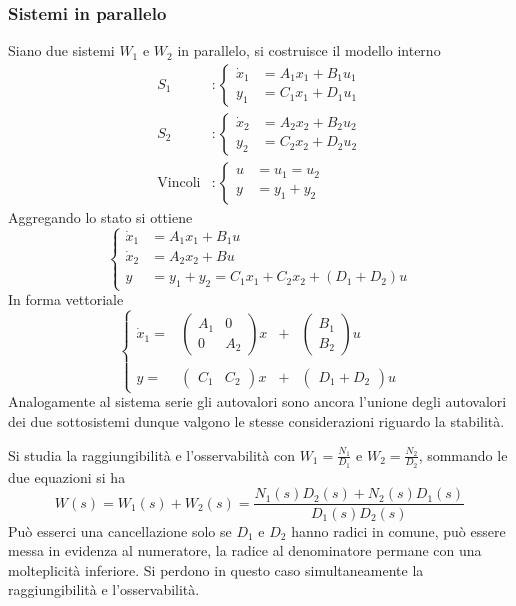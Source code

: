 \subsubsection{Sistemi in parallelo}
Siano due sistemi $W_1$ e $W_2$ in parallelo, si costruisce il modello interno
$$
\begin{aligned}
S_1 &: \left\{\begin{aligned}
\dot{x}_1 & = A_1x_1 + B_1u_1\\
y_1 &= C_1 x_1 + D_1u_1
\end{aligned}\right. \\
S_2 & : \left\{\begin{aligned}
\dot{x}_2 & = A_2x_2 + B_2u_2\\
y_2 &= C_2 x_2 + D_2u_2
\end{aligned}\right. \\
\text{Vincoli} &: \left\{\begin{aligned}
u&=u_1=u_2\\
y&=y_1+y_2
\end{aligned}\right.
\end{aligned}
$$
Aggregando lo stato si ottiene
$$
\left\{\begin{aligned}
\dot{x}_1 & = A_1x_1 + B_1u\\
\dot{x}_2 &= A_2x_2 + Bu \\
y &= y_1+y_2 = C_1x_1 + C_2x_2 + (D_1+D_2)u
\end{aligned}\right.
$$
In forma vettoriale
$$
\left\{\begin{array}{cccc}
\dot{x}_1 =& \begin{pmatrix}
A_1 & 0 \\ 0 & A_2
\end{pmatrix}x& +& \begin{pmatrix}
B_1 \\ B_2
\end{pmatrix}u\\ \\
y =& \begin{pmatrix}
C_1 & C_2
\end{pmatrix}x &+& \begin{pmatrix}
D_1+D_2
\end{pmatrix}u
\end{array}\right.
$$
Analogamente al sistema serie gli autovalori sono ancora l'unione degli
autovalori dei due sottosistemi dunque valgono le stesse considerazioni
riguardo la stabilità.

Si studia la raggiungibilità e l'osservabilità con $W_1 = \frac{N_1}{D_1}$ e
$W_2 = \frac{N_2}{D_2}$, sommando le due equazioni si ha
$$
W(s) = W_1(s) + W_2(s) = \frac{N_1(s)D_2(s) + N_2(s)D_1(s)}
{D_1(s)D_2(s)}
$$
Può esserci una cancellazione solo se $D_1$ e $D_2$ hanno radici in comune, può
essere messa in evidenza al numeratore,
la radice al denominatore permane con una molteplicità inferiore.
Si perdono in questo caso simultaneamente la raggiungibilità e l'osservabilità.

